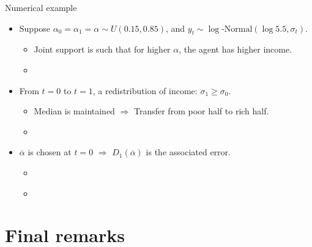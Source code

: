 \documentclass[10pt, handout]{beamer}
\begin{document}
\begin{frame}[label=Category-Example]{Numerical example}
	\vfill
	\begin{itemize}
		\item Suppose $\alpha_{0} = \alpha_{1} = \alpha \sim U(0.15,0.85)$, and $y_{t} \sim \log\text{-Normal}(\log 5.5, \sigma_{t})$.\vspace{1ex}
			\begin{itemize}
				\item Joint support is such that for higher $\alpha$, the agent has higher income. \vspace{1ex}
				\item \hyperlink{Category-JointSupport}{}
			\end{itemize}\vfill
		
		\item From $t = 0$ to $t = 1$, a redistribution of income: $\sigma_{1} \geq \sigma_{0}$.\vspace{1ex}
			\begin{itemize}
				\item Median is maintained $\Rightarrow$ Transfer from poor half to rich half. \vspace{1ex}
				\item \hyperlink{DensityRA}{} 
			\end{itemize} \vfill
			
		\item $\overline{\alpha}$ is chosen at $t = 0$ $\Rightarrow$ $D_{1}(\overline{\alpha})$ is the associated error.\vspace{1ex}
			\begin{itemize}
				\item \hyperlink{alphaBar-RA}{} \vspace{1ex}
				\item \hyperlink{Dt-RA}{} 
			\end{itemize} \vfill

	\end{itemize}

\end{frame}


\section{Final remarks}


\begin{frame}
	\tableofcontents[currentsection]
\end{frame}
\end{document}
